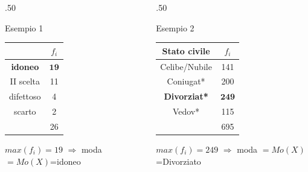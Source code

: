 \documentclass[compress]{beamer}
\begin{document}
\begin{frame}
\begin{columns}[T]
\begin{column}{.50\linewidth}
\begin{block}{Esempio 1}
		\begin{table}
			\centering
		
			\begin{tabular}{|c | c |}
				\hline
				 & $f_i$\\
				\hline
				\textbf{idoneo}  & $\mathbf{19}$ \\
				II scelta & 11\\
				difettoso & 4 \\
				scarto & 2\\
				\hline
				& 26 \\
				\hline
			\end{tabular}
		\end{table}

\vspace{3mm}
\centering
$max(f_i) =19$  $\Longrightarrow$ moda $=Mo(X)$=idoneo
	
	\end{block}
\end{column}

\begin{column}{.50\linewidth}
	\begin{block}{Esempio 2}
			
			\begin{table}
				\centering
				\begin{tabular}{|c | c |}
					\hline
					Stato civile & $f_i$\\
					\hline
						Celibe/Nubile & 141\\
					Coniugat*  & 200 \\
					\textbf{Divorziat*} & $\mathbf{249}$\\
					Vedov* & 115 \\
					\hline
					& 695 \\
					\hline
				\end{tabular}
			\end{table}

		\vspace{3mm}
		
		$max(f_i) =249$  $\Longrightarrow$ moda $=Mo(X)$=Divorziato
		
	\end{block}
\end{column}

\end{columns}
	
\end{frame}
\end{document}
